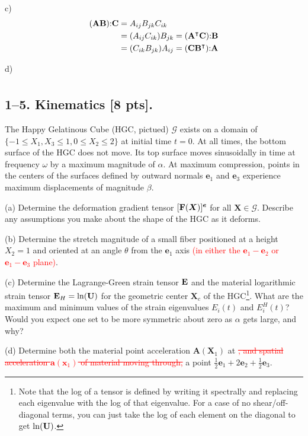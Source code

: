 c)
\begin{align*}
    (\mathbf{A} \mathbf{B}) \mathbf{:} \mathbf{C} &=A_{ij}B_{jk}C_{ik} \\
    &= (A_{ij}C_{ik})B_{jk} = (\mathbf{A}^\intercal \mathbf{C})\mathbf{:} \mathbf{B}\\
    &=(C_{ik}B_{jk})A_{ij}= (\mathbf{C} \mathbf{B}^\intercal)\mathbf{:} \mathbf{A}
\end{align*}

d)
\begin{align*}
    
\end{align*}
\bigskip
\subsection*{1--5. \textbf{Kinematics} [8 pts].} The Happy Gelatinous Cube (HGC, pictued) $\mathcal{G}$ exists on a domain of $\{-1\leq X_1 , X_3\leq1, 0\leq X_2 \leq 2\}$ at initial time $t=0$. 
At all times, the bottom surface of the HGC does not move. 
Its top surface moves sinusoidally in time at frequency $\omega$ by a maximum magnitude of $\alpha$. 
At maximum compression, points in the centers of the surfaces defined by outward normals $\bm{e}_1$ and $\bm{e}_3$ experience maximum displacements of magnitude $\beta$. 

\medskip
(a) Determine the deformation gradient tensor $[\mathbf{F}(\bm{X})]^{\bm{e}}$ for all $\bm{X}\in \mathcal{G}$. 
Describe any assumptions you make about the shape of the HGC as it deforms. 

\medskip
(b) Determine the stretch magnitude of a small fiber positioned at a height $X_2 = 1$ and oriented at an angle $\theta$ from the $\bm{e}_1$ axis \textcolor{red}{(in either the $\bm{e}_1- \bm{e}_2$ or $\bm{e}_1- \bm{e}_3$ plane)}. 

\medskip
(c) Determine the Lagrange-Green strain tensor $\mathbf{E}$ and the material logarithmic strain tensor $\mathbf{E}_H = \ln (\mathbf{U})$ for the geometric center $\bm{X}_c$ of the HGC\footnote{Note that the log of a tensor is defined by writing it spectrally and replacing each eigenvalue with the log of that eigenvalue. For a case of no shear/off-diagonal terms, you can just take the log of each element on the diagonal to get $\ln(\mathbf{U})$.}. 
What are the maximum and minimum values of the strain eigenvalues $E_i(t)$ and $E_i^H(t)$? 
Would you expect one set to be more symmetric about zero as $\alpha$ gets large, and why?

\medskip
(d) Determine both the material point acceleration $\bm{A}(\bm{X}_1)$ at \textcolor{red}{\sout{, and spatial acceleration $\bm{a}(\bm{x}_1)$ of material moving through,}} a point $\frac{1}{2} \bm{e}_1 + 2\bm{e}_2 + \frac{1}{2} \bm{e}_3$.  

\begin{figure}
\centering
{}
\end{figure}

